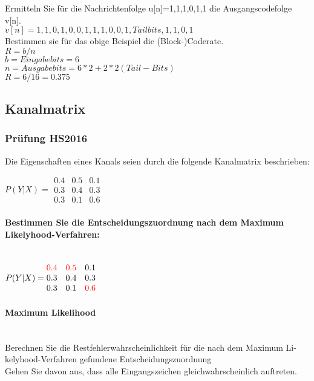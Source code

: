 Ermitteln Sie für die Nachrichtenfolge {u[n]}={1,1,1,0,1,1} die Ausgangscodefolge {v[n]}.\\
${v[n]}={1,1,0,1,0,0,1,1,1,0,0,1,Tailbits,1,1,0,1}$\\

Bestimmen sie für das obige Beispiel die (Block-)Coderate.\\
$R=b/n$\\
$b=Eingabebits=6$\\
$n=Ausgabebits=6*2+2*2 (Tail-Bits)$\\
$R=6/16=0.375$

\subsection{Kanalmatrix}
\subsubsection{Prüfung HS2016}
Die Eigenschaften eines Kanals seien durch die folgende Kanalmatrix beschrieben: 

$P(Y|X) = \begin{matrix}
    0.4 & 0.5 & 0.1\\
    0.3 & 0.4 & 0.3\\
    0.3 & 0.1 & 0.6
\end{matrix}$

\paragraph{Bestimmen Sie die Entscheidungszuordnung nach dem Maximum Likelyhood-Verfahren:}\mbox{}\\
$P(Y|X) = \begin{matrix}
    \textcolor{red}{0.4} & \textcolor{red}{0.5} & 0.1\\
    0.3 & 0.4 & 0.3\\
    0.3 & 0.1 & \textcolor{red}{0.6}
\end{matrix}$

\paragraph{Maximum Likelihood}\mbox{}\\
Berechnen Sie die Restfehlerwahrscheinlichkeit für die nach dem Maximum Li-kelyhood-Verfahren gefundene Entscheidungszuordnung\\
Gehen Sie davon aus, dass alle Eingangszeichen gleichwahrscheinlich auftreten.\\

